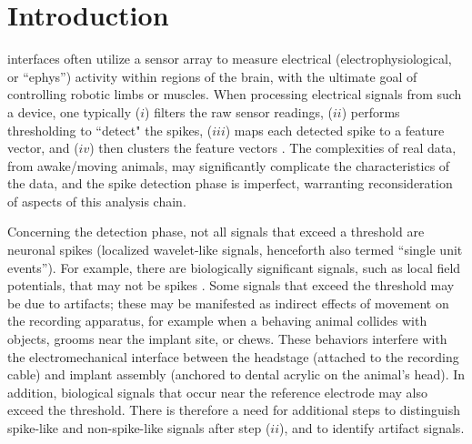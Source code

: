 \documentclass[journal]{IEEEtran}
\begin{document}
\section{Introduction\label{sec:intro}}
% 
% 
% 
% 
 interfaces often utilize a sensor array to measure electrical (electrophysiological, or ``ephys'') activity within regions of the brain, with the ultimate goal of controlling robotic limbs \cite{Nature2012} or muscles. When processing electrical signals from such a device, one typically ($i$) filters the raw sensor readings, ($ii$) performs thresholding
to ``detect" the spikes, ($iii$) maps each detected spike to a
feature vector, and ($iv$) then clusters the feature vectors
\cite{Lewicki}. The complexities of real data, from awake/moving animals, may significantly complicate the characteristics of the data, and the spike detection phase is imperfect, warranting reconsideration of aspects of this analysis chain.

Concerning the detection phase, not all signals that exceed a threshold are neuronal spikes (localized wavelet-like signals, henceforth also termed ``single unit events''). For example, there are biologically significant signals, such as local field potentials, that may not be spikes \cite{Donoghue07}. Some signals that exceed the threshold may be due to artifacts; these may be manifested as indirect effects of movement on the recording apparatus, for example when a behaving animal collides with objects, grooms near the implant site, or chews. These behaviors interfere with the electromechanical interface between the headstage (attached to the recording cable) and implant assembly
(anchored to dental acrylic on the animal's head).  In addition, biological signals that occur near the reference electrode may also exceed the threshold.  There is therefore a need for additional steps to distinguish spike-like and non-spike-like signals after step ($ii$), and to identify artifact signals.
\end{document}
